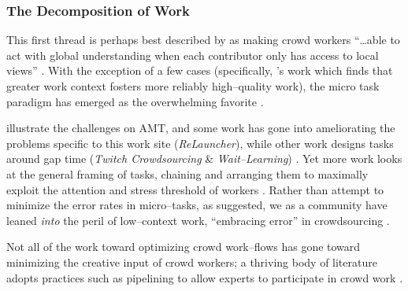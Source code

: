 \documentclass[trackingWork]{subfiles}
\begin{document}
\subsubsection[the decomposition of work]{The Decomposition of Work}\label{sec:decomposition}

\subsubsubsection{\crowdworkpers}
This first thread is
perhaps best described by \citeauthor{verroios2014context} as
making crowd workers ``\dots able to act with
global understanding when each contributor only has access to local views''
\cite{verroios2014context}.
With the exception of a few cases
(specifically, \citeauthor{Kinnaird:2012:WTM:2389176.2389219}'s work
which finds that greater work context fosters more reliably high--quality work),
the micro task paradigm has emerged as the overwhelming favorite
\cite{selfsourcingTeevan2014,selfsourcingTeevan2016,
      cheng2015break,Kinnaird:2012:WTM:2389176.2389219}.


\citeauthor{taskSearch} illustrate the challenges on AMT,
and some work has gone into ameliorating the problems specific to this work site
(\textit{ReLauncher}), %
while other work designs tasks around gap time
(\textit{Twitch Crowdsourcing} \& \textit{Wait--Learning})
\cite{taskSearch,KucherbaevReLauncher,Vaish:2014:TCC:2611222.2556996,
      Cai:2015:WLW:2702123.2702267}.
Yet more work looks at the general framing of tasks,
chaining and arranging them to maximally exploit
the attention and stress threshold %
of workers
\cite{Cai:2016:CRI:2858036.2858237}.
Rather than attempt to minimize the error rates in micro--tasks,
as \citeauthor{Kinnaird:2012:WTM:2389176.2389219} suggested,
we as a community have leaned \textit{into} the peril of
low--context work,
``embracing error'' in crowdsourcing
\cite{embracingErrorKrishna}.

Not all of the work toward optimizing crowd work--flows has gone toward
minimizing the creative input of crowd workers;
a thriving body of literature adopts
practices such as pipelining to allow experts to participate in crowd work
\cite{foundry}.
\end{document}
